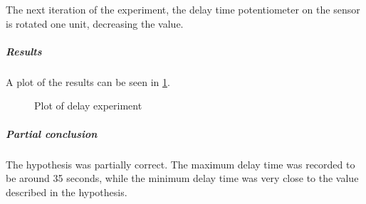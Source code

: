 The next iteration of the experiment, the delay time potentiometer on the sensor
is rotated one unit, decreasing the value.

\subparagraph{Results}

A plot of the results can be seen in \cref{fig:pir_delay}.

\begin{figure}[htbp]
\centering
{}
\caption{Plot of delay experiment}\label{fig:pir_delay}
\end{figure}

\subparagraph{Partial conclusion}

The hypothesis was partially correct. The maximum delay time was recorded to be
around 35 seconds, while the minimum delay time was very close to the value
described in the hypothesis.
